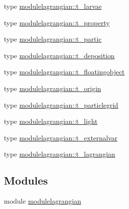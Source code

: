 \begin{DoxyCompactItemize}
\item 
type \mbox{\hyperlink{structmodulelagrangian_1_1t__larvae}{modulelagrangian\+::t\+\_\+larvae}}
\item 
type \mbox{\hyperlink{structmodulelagrangian_1_1t__property}{modulelagrangian\+::t\+\_\+property}}
\item 
type \mbox{\hyperlink{structmodulelagrangian_1_1t__partic}{modulelagrangian\+::t\+\_\+partic}}
\item 
type \mbox{\hyperlink{structmodulelagrangian_1_1t__deposition}{modulelagrangian\+::t\+\_\+deposition}}
\item 
type \mbox{\hyperlink{structmodulelagrangian_1_1t__floatingobject}{modulelagrangian\+::t\+\_\+floatingobject}}
\item 
type \mbox{\hyperlink{structmodulelagrangian_1_1t__origin}{modulelagrangian\+::t\+\_\+origin}}
\item 
type \mbox{\hyperlink{structmodulelagrangian_1_1t__particlegrid}{modulelagrangian\+::t\+\_\+particlegrid}}
\item 
type \mbox{\hyperlink{structmodulelagrangian_1_1t__light}{modulelagrangian\+::t\+\_\+light}}
\item 
type \mbox{\hyperlink{structmodulelagrangian_1_1t__externalvar}{modulelagrangian\+::t\+\_\+externalvar}}
\item 
type \mbox{\hyperlink{structmodulelagrangian_1_1t__lagrangian}{modulelagrangian\+::t\+\_\+lagrangian}}
\end{DoxyCompactItemize}
\subsection*{Modules}
\begin{DoxyCompactItemize}
\item 
module \mbox{\hyperlink{namespacemodulelagrangian}{modulelagrangian}}
\end{DoxyCompactItemize}
